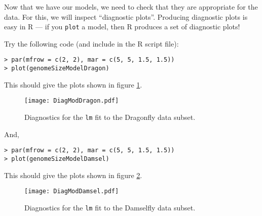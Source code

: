 Now that we have our models, we need to check that they are appropriate 
for the data. For this, we will inspect ``diagnostic plots''. Producing 
diagnostic plots is easy in R --- if you {\tt plot} a model, then R 
produces a set of diagnostic plots! 

\begin{compactitem}[$\quad\star$]
	\item Try the following code (and include in the R script file):
\end{compactitem}
\begin{lstlisting}
> par(mfrow = c(2, 2), mar = c(5, 5, 1.5, 1.5))
> plot(genomeSizeModelDragon)
\end{lstlisting}
This should give the plots shown in figure \ref{fig:DiagModDragon}.
\begin{figure} \centering
	\texttt{[image: DiagModDragon.pdf]}
	\caption{Diagnostics for the {\tt lm} fit to the Dragonfly data 
	subset.}
	\label{fig:DiagModDragon} 
\end{figure}
And,
\begin{lstlisting}
> par(mfrow = c(2, 2), mar = c(5, 5, 1.5, 1.5))
> plot(genomeSizeModelDamsel)
\end{lstlisting}
This should give the plots shown in figure \ref{fig:DiagModDamsel}.

\begin{figure}\centering
	\texttt{[image: DiagModDamsel.pdf]}
	\caption{Diagnostics for the {\tt lm} fit to the Damselfly data 
	subset.}
	\label{fig:DiagModDamsel} 
\end{figure}

